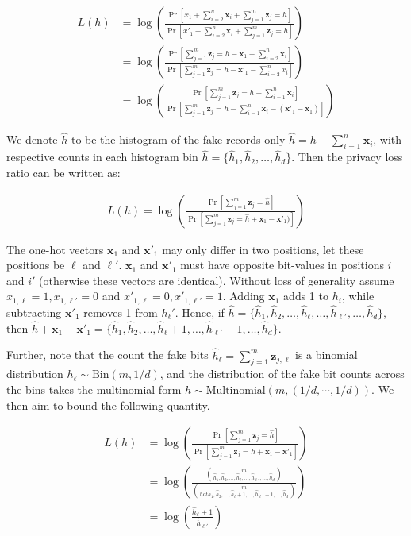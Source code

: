 \documentclass[11pt]{article}
\newcommand{\bbx}{\pmb{x}}
\newcommand{\bbz}{\pmb{z}}
\begin{document}
\begin{align*}
L(h) &= \log \left ( \frac{\Pr[x_1 + \sum^n_{i=2} \bbx_i + \sum^m_{j=1} \bbz_j = h]}{\Pr[x'_1 + \sum^n_{i=2} \bbx_i + \sum^m_{j=1} \bbz_j = h]} \right ) \\
&=  \log \left ( \frac{\Pr[\sum^m_{j=1} \bbz_j = h - \bbx_1 - \sum^n_{i=2} \bbx_i ]}{\Pr[ \sum^m_{j=1} \bbz_j = h - \bbx'_1 - \sum^n_{i=2} x_i ]} \right )  \\
&=  \log \left ( \frac{\Pr[\sum^m_{j=1} \bbz_j = h - \sum^n_{i=1}  \bbx_i ]}{\Pr[ \sum^m_{j=1} \bbz_j = h  - \sum^n_{i=1} \bbx_i  - (\bbx'_1 - \bbx_1) ]} \right )
\end{align*}

We denote  $\hat{h}$ to be the histogram of the fake records only $\hat{h} = h - \sum^n_{i=1} \bbx_i$, with respective counts in each histogram bin $\hat{h} = \{ \hat{h}_1, \hat{h}_2, \dots , \hat{h}_d\}$.  Then the privacy loss ratio can be written as:

\begin{align*}
L(h) =  \log \left ( \frac{\Pr[\sum^m_{j=1} \bbz_j = \hat{h} ]}{\Pr[ \sum^m_{j=1} \bbz_j = \hat{h}  + \bbx_1 - \bbx'_1) ]} \right )
\end{align*}



The one-hot vectors $\bbx_1$  and $\bbx'_1$ may only differ in two positions, let these positions be $\ell$ and $\ell'$. 
$\bbx_1$ and $\bbx'_1$ must have opposite bit-values in positions $i$ and $i'$ (otherwise these vectors are identical). 
Without loss of generality assume $x_{1,\ell} = 1, x_{1,\ell'} = 0$ and $x'_{1,\ell} = 0, x'_{1,\ell'} = 1$.  
Adding $\bbx_1$ adds 1 to $h_i$, while subtracting $\bbx'_1$ removes 1 from $h_\ell'$.
Hence,  if $\hat{h} = \{ \hat{h}_1, \hat{h}_2, \dots , \hat{h}_\ell, \dots, \hat{h}_{\ell'}, \dots, \hat{h}_d\} $, then  $\hat{h} + \bbx_1 -\bbx'_1 =  \{ \hat{h}_1, \hat{h}_2, \dots , \hat{h}_\ell + 1, \dots, \hat{h}_{\ell'} -1, \dots, \hat{h}_d\} $.

Further, note that the count the fake bits $\hat{h}_\ell = \sum^m_{j=1} \bbz_{j,\ell}$ is a binomial distribution $h_\ell \sim \text{Bin}(m, 1/d)$, and the distribution of the fake bit counts across the bins takes the multinomial form $ \hat{h} \sim \text{Multinomial}(m,(1/d,\cdots, 1/d))$. We then aim to bound the following quantity.

\begin{align*}
 L(h) &= \log \left ( \frac{\Pr[\sum^m_{j=1} \bbz_j = \hat{h} ]}{\Pr[ \sum^m_{j=1} \bbz_j = \hat{h} + \bbx_1 - \bbx'_1]} \right ) \\
 & = \log  \left ( \frac{ {m \choose \hat{h}_1, \hat{h}_2, \dots , \hat{h}_\ell, \dots, \hat{h}_{\ell'}, \dots, \hat{h}_d}}{ { m \choose hat{h}_1, \hat{h}_2, \dots , \hat{h}_\ell + 1, \dots, \hat{h}_{\ell'} - 1, \dots, \hat{h}_d}} \right ) \\
 & = \log  \left ( \frac{\hat{h}_\ell + 1}{\hat{h}_{\ell'}} \right ) 
\end{align*}
\end{document}
